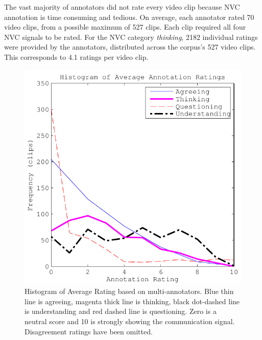 The vast majority of annotators did not rate every video clip because \ac{NVC} annotation is time consuming and tedious. On average, each annotator rated 70 video clips, from a possible maximum of 527 clips. Each clip required all four \ac{NVC} signals to be rated. For the \ac{NVC} category \textit{thinking}, 2182 individual ratings were provided by the annotators, distributed across the corpus's 527 video clips. This corresponds to 4.1 ratings per video clip. 

\begin{figure}[tb]
\centering
\includegraphics[width = 0.5 \columnwidth]{corpus/ratingof4.pdf}
\caption[Histogram of Average Rating based on multi-annotators.]{Histogram of Average Rating based on multi-annotators. Blue thin line is agreeing, magenta thick line is thinking, black dot-dashed line is understanding and red dashed line is questioning. Zero is a neutral score and 10 is strongly showing the communication signal. Disagreement ratings have been omitted.}
\label{RatingScoresFigure}
\end{figure}

